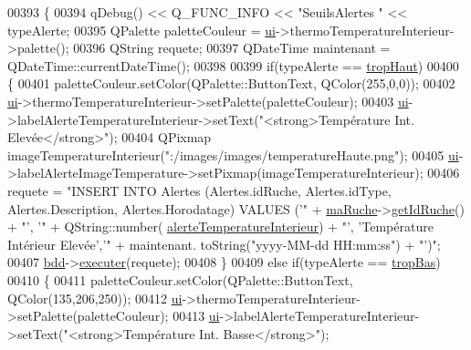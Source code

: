 \begin{DoxyCode}
00393 \{
00394     qDebug() << Q\_FUNC\_INFO << \textcolor{stringliteral}{"SeuilsAlertes "} << typeAlerte;
00395     QPalette paletteCouleur = \hyperlink{class_ruche_ihm_a64786058bd7f88ca2f1e9743bb27c25b}{ui}->thermoTemperatureInterieur->palette();
00396     QString requete;
00397     QDateTime maintenant = QDateTime::currentDateTime();
00398 
00399     \textcolor{keywordflow}{if}(typeAlerte == \hyperlink{parametres_8h_aaa6de8207c94675264c90b10b613368dabc650d9700ae19f2696e6a6e3f9ab067}{tropHaut})
00400      \{
00401         paletteCouleur.setColor(QPalette::ButtonText, QColor(255,0,0));
00402         \hyperlink{class_ruche_ihm_a64786058bd7f88ca2f1e9743bb27c25b}{ui}->thermoTemperatureInterieur->setPalette(paletteCouleur);
00403         \hyperlink{class_ruche_ihm_a64786058bd7f88ca2f1e9743bb27c25b}{ui}->labelAlerteTemperatureInterieur->setText(\textcolor{stringliteral}{"<strong>Température Int. Elevée</strong>"});
00404         QPixmap imageTemperatureInterieur(\textcolor{stringliteral}{":/images/images/temperatureHaute.png"});
00405         \hyperlink{class_ruche_ihm_a64786058bd7f88ca2f1e9743bb27c25b}{ui}->labelAlerteImageTemperature->setPixmap(imageTemperatureInterieur);
00406         requete = \textcolor{stringliteral}{"INSERT INTO Alertes (Alertes.idRuche, Alertes.idType, Alertes.Description,
       Alertes.Horodatage) VALUES ('"} + \hyperlink{class_ruche_ihm_a43a6b1fa31f4fba58d919daae3707b38}{maRuche}->\hyperlink{class_ruche_a9f2de5ef29557ec7a53d5e22df34d164}{getIdRuche}() + \textcolor{stringliteral}{"', '"} + QString::number(
      \hyperlink{parametres_8h_a83a725fd153179a2bd97afcc8307737ba6d07a737b602e59b2350e913e4763724}{alerteTemperatureInterieur}) + \textcolor{stringliteral}{"', 'Température Intérieur Elevée','"} + maintenant.
      toString(\textcolor{stringliteral}{"yyyy-MM-dd  HH:mm:ss"}) + \textcolor{stringliteral}{"')"};
00407         \hyperlink{class_ruche_ihm_a0851936fe212e8d40538264f09749153}{bdd}->\hyperlink{class_base_de_donnees_aa8de5f8f8bb17edc43f5c0ee33712081}{executer}(requete);
00408      \}
00409      \textcolor{keywordflow}{else} \textcolor{keywordflow}{if}(typeAlerte == \hyperlink{parametres_8h_aaa6de8207c94675264c90b10b613368da4257e2f8921856770c8266f55c937295}{tropBas})
00410      \{
00411         paletteCouleur.setColor(QPalette::ButtonText, QColor(135,206,250));
00412         \hyperlink{class_ruche_ihm_a64786058bd7f88ca2f1e9743bb27c25b}{ui}->thermoTemperatureInterieur->setPalette(paletteCouleur);
00413         \hyperlink{class_ruche_ihm_a64786058bd7f88ca2f1e9743bb27c25b}{ui}->labelAlerteTemperatureInterieur->setText(\textcolor{stringliteral}{"<strong>Température Int. Basse</strong>"});

\end{DoxyCode}
